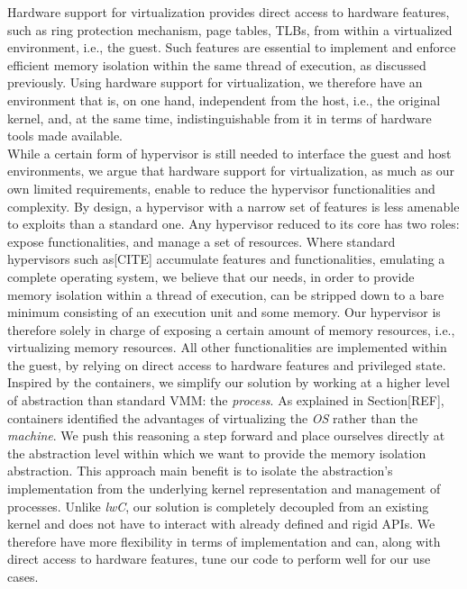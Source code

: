 \documentclass[letterpaper,twocolumn,10pt]{article}
\begin{document}
Hardware support for virtualization provides direct access to hardware features, such as ring protection mechanism, page tables, TLBs, from within a virtualized environment, i.e., the guest.
Such features are essential to implement and enforce efficient memory isolation within the same thread of execution, as discussed previously.
Using hardware support for virtualization, we therefore have an environment that is, on one hand, independent from the host, i.e., the original kernel, and, at the same time, indistinguishable from it in terms of hardware tools made available. \\

While a certain form of hypervisor is still needed to interface the guest and host environments, we argue that hardware support for virtualization, as much as our own limited requirements, enable to reduce the hypervisor functionalities and complexity.
By design, a hypervisor with a narrow set of features is less amenable to exploits than a standard one.
Any hypervisor reduced to its core has two roles: expose functionalities, and manage a set of resources.
Where standard hypervisors such as[CITE] accumulate features and functionalities, emulating a complete operating system, we believe that our needs, in order to provide memory isolation within a thread of execution, can be stripped down to a bare minimum consisting of an execution unit and some memory.
Our hypervisor is therefore solely in charge of exposing a certain amount of memory resources, i.e., virtualizing memory resources.
All other functionalities are implemented within the guest, by relying on direct access to hardware features and privileged state. \\

Inspired by the containers, we simplify our solution by working at a higher level of abstraction than standard VMM: the \emph{process}.
As explained in Section[REF], containers identified the advantages of virtualizing the \emph{OS} rather than the \emph{machine}.
We push this reasoning a step forward and place ourselves directly at the abstraction level within which we want to provide the memory isolation abstraction.
This approach main benefit is to isolate the abstraction's implementation from the underlying kernel representation and management of processes.
Unlike \emph{lwC}, our solution is completely decoupled from an existing kernel and does not have to interact with already defined and rigid APIs.
We therefore have more flexibility in terms of implementation and can, along with direct access to hardware features, tune our code to perform well for our use cases.\\
\end{document}

